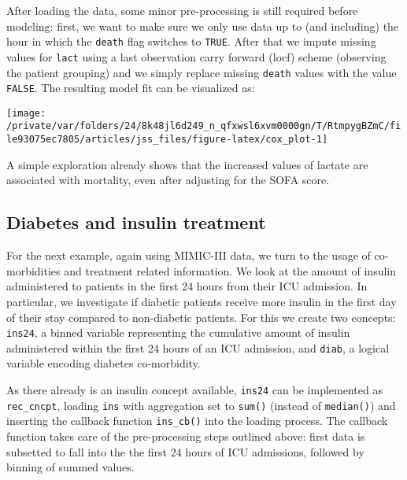 \documentclass[
  notitle]{jss}
\begin{document}
After loading the data, some minor pre-processing is still required
before modeling: first, we want to make sure we only use data up to (and
including) the hour in which the \texttt{death} flag switches to
\texttt{TRUE}. After that we impute missing values for \texttt{lact}
using a last observation carry forward (locf) scheme (observing the
patient grouping) and we simply replace missing \texttt{death} values
with the value \texttt{FALSE}. The resulting model fit can be visualized
as:

\begin{CodeChunk}


\begin{center}\texttt{[image: /private/var/folders/24/8k48jl6d249\_n\_qfxwsl6xvm0000gn/T/RtmpygBZmC/file93075ec7805/articles/jss\_files/figure-latex/cox\_plot-1]} \end{center}

\end{CodeChunk}

A simple exploration already shows that the increased values of lactate
are associated with mortality, even after adjusting for the SOFA score.

\hypertarget{diabetes-and-insulin-treatment}{%
\subsection{Diabetes and insulin
treatment}\label{diabetes-and-insulin-treatment}}

For the next example, again using MIMIC-III data, we turn to the usage
of co-morbidities and treatment related information. We look at the
amount of insulin administered to patients in the first 24 hours from
their ICU admission. In particular, we investigate if diabetic patients
receive more insulin in the first day of their stay compared to
non-diabetic patients. For this we create two concepts: \texttt{ins24},
a binned variable representing the cumulative amount of insulin
administered within the first 24 hours of an ICU admission, and
\texttt{diab}, a logical variable encoding diabetes co-morbidity.

As there already is an insulin concept available, \texttt{ins24} can be
implemented as \texttt{rec\_cncpt}, loading \texttt{ins} with
aggregation set to \texttt{sum()} (instead of \texttt{median()}) and
inserting the callback function \texttt{ins\_cb()} into the loading
process. The callback function takes care of the pre-processing steps
outlined above: first data is subsetted to fall into the the first 24
hours of ICU admissions, followed by binning of summed values.
\end{document}
